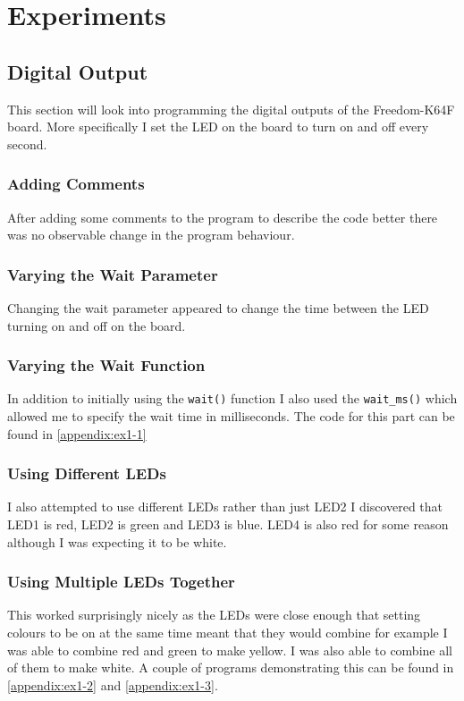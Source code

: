 \documentclass[a4paper,12pt]{scrartcl}
\begin{document}
	\section{Experiments}
	{
		\subsection{Digital Output}
		{
			This section will look into programming the digital outputs of the Freedom-K64F board. More specifically I set the LED on the board to turn on and off every second.
			\subsubsection{Adding Comments}
			{
				After adding some comments to the program to describe the code better there was no observable change in the program behaviour. 
			}
			\subsubsection{Varying the Wait Parameter}
			{
				Changing the wait parameter appeared to change the time between the LED turning on and off on the board.
			}
			\subsubsection{Varying the Wait Function}
			{
				In addition to initially using the \lstinline|wait()| function I also used the \lstinline|wait_ms()| which allowed me to specify the wait time in milliseconds. The code for this part can be found in \cref{appendix:ex1-1}
			}
			\subsubsection{Using Different LEDs}
			{
				I also attempted to use different LEDs rather than just LED2 I discovered that LED1 is red, LED2 is green and LED3 is blue. LED4 is also red for some reason although I was expecting it to be white.
			}
			\subsubsection{Using Multiple LEDs Together}
			{
				This worked surprisingly nicely as the LEDs were close enough that setting colours to be on at the same time meant that they would combine for example I was able to combine red and green to make yellow. I was also able to combine all of them to make white. A couple of programs demonstrating this can be found in \cref{appendix:ex1-2} and \cref{appendix:ex1-3}.
			}
}}
\end{document}
